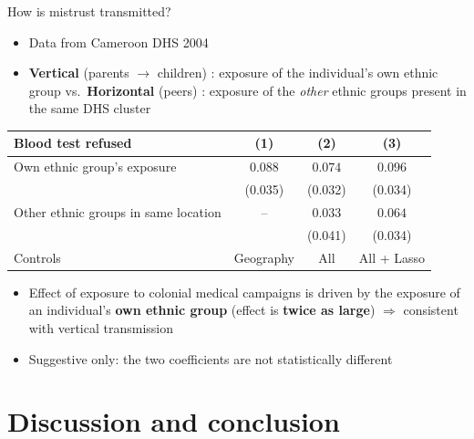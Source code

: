 \documentclass[aspectratio=1610]{beamer}
\newcommand{\backupbutton}[2]{\hyperlink{#1}{\beamergotobutton{#2}}}
\begin{document}
\begin{frame}[label=main-transmission]{How is mistrust transmitted?}
  \begin{itemize}
    \item Data from Cameroon DHS 2004
    \item \textbf{Vertical} (parents $\to$ children) : exposure of the individual's own ethnic group vs.\ \textbf{Horizontal} (peers) : exposure of the \emph{other} ethnic groups present in the same DHS cluster
  \end{itemize}

  \vspace{0.3em}
  \centering
  \footnotesize
  \setlength{\tabcolsep}{4pt}
  \begin{tabular}{lccc}
    \toprule
    Blood test refused & (1) & (2) & (3) \\
    \midrule
    Own ethnic group's exposure          & $0.088$ & $0.074$ & $0.096$ \\
                                         & (0.035) & (0.032) & (0.034) \\
    Other ethnic groups in same location & --      & $0.033$ & $0.064$ \\
                                         &         & (0.041) & (0.034) \\
    \midrule
    Controls & Geography & All & All + Lasso \\
    \bottomrule
  \end{tabular}

  \vspace{0.4em}
  \raggedright
  \begin{itemize}
    \item Effect of exposure to colonial medical campaigns is driven by the exposure of an individual's \textbf{own ethnic group} (effect is \textbf{twice as large}) $\Rightarrow$ consistent with vertical transmission
    \item {Suggestive only: the two coefficients are not statistically different} \backupbutton{bk-transmission}{Full table}
  \end{itemize}
\end{frame}

\section{Discussion and conclusion}
\end{document}
